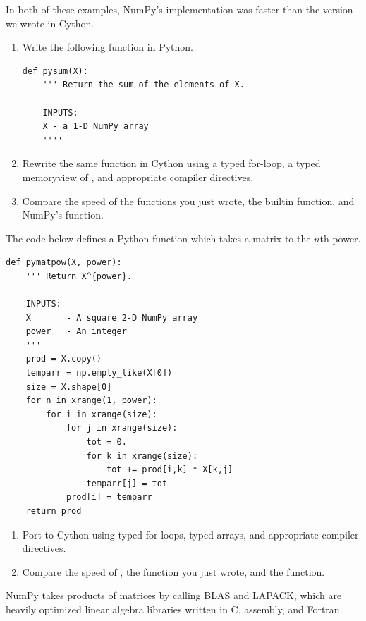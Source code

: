 In both of these examples, NumPy's implementation was faster than the version we wrote in Cython.

\begin{problem}
\leavevmode
\begin{enumerate}
\item Write the following function in Python.
\begin{lstlisting}
def pysum(X):
    ''' Return the sum of the elements of X.
    
    INPUTS:
    X - a 1-D NumPy array
    ''''
\end{lstlisting}

\item Rewrite the same function in Cython using a typed for-loop, a typed memoryview of , and appropriate compiler directives.

\item Compare the speed of the functions you just wrote, the builtin  function, and NumPy's  function.
\end{enumerate}
\end{problem}

\begin{problem}
The code below defines a Python function which takes a matrix to the $n$th power.
\begin{lstlisting}
def pymatpow(X, power):
    ''' Return X^{power}.
    
    INPUTS:
    X		- A square 2-D NumPy array
    power	- An integer
    '''
    prod = X.copy()
    temparr = np.empty_like(X[0])
    size = X.shape[0]
    for n in xrange(1, power):
        for i in xrange(size):
            for j in xrange(size):
                tot = 0.
                for k in xrange(size):
                    tot += prod[i,k] * X[k,j]
                temparr[j] = tot
            prod[i] = temparr
    return prod
\end{lstlisting}

\begin{enumerate}
\item Port  to Cython using typed for-loops, typed arrays, and appropriate compiler directives.
\item Compare the speed of , the function you just wrote, and the  function.
\end{enumerate}
NumPy takes products of matrices by calling BLAS and LAPACK, which are heavily optimized linear algebra libraries written in C, assembly, and Fortran.
\end{problem}


